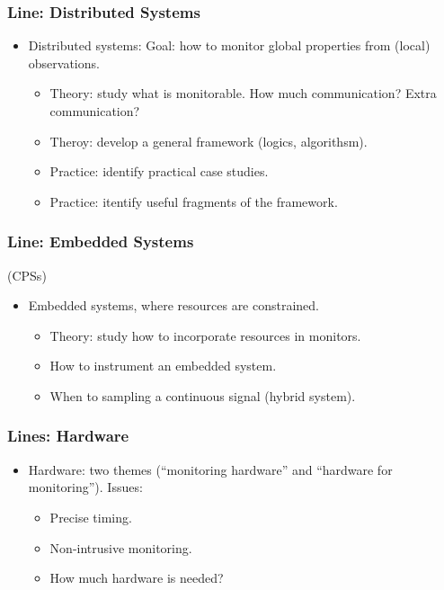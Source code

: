 \documentclass{beamer}
\begin{document}
\begin{frame}
  \frametitle{Line: Distributed Systems}

  \begin{itemize}
  \item \alert{Distributed systems}: 
    Goal: how to monitor global properties from (local) observations. 
    \begin{itemize} 
    \item Theory: study what is monitorable. How much communication?
      Extra communication?
    \item Theroy: develop a general framework (logics, algorithsm).
    \item Practice: identify practical case studies.
    \item Practice: itentify useful fragments of the framework.
    \end{itemize}
  \end{itemize}
\end{frame}

\begin{frame}
  \frametitle{Line: Embedded Systems} (CPSs)
  \begin{itemize}
  \item \alert{Embedded systems}, where resources are constrained.
    \begin{itemize} 
    \item Theory: study how to incorporate resources in monitors.
    \item How to instrument an embedded system.
    \item When to sampling a continuous signal (hybrid system).
    \end{itemize}
  \end{itemize}
\end{frame}

\begin{frame}
  \frametitle{Lines: Hardware}

  \begin{itemize}
  \item \alert{Hardware}: two themes (``monitoring hardware'' and ``hardware
    for monitoring''). Issues:
    \begin{itemize}
    \item Precise timing.
    \item Non-intrusive monitoring.
    \item How much hardware is needed?
    \end{itemize}
  \end{itemize}
\end{frame}
\end{document}

